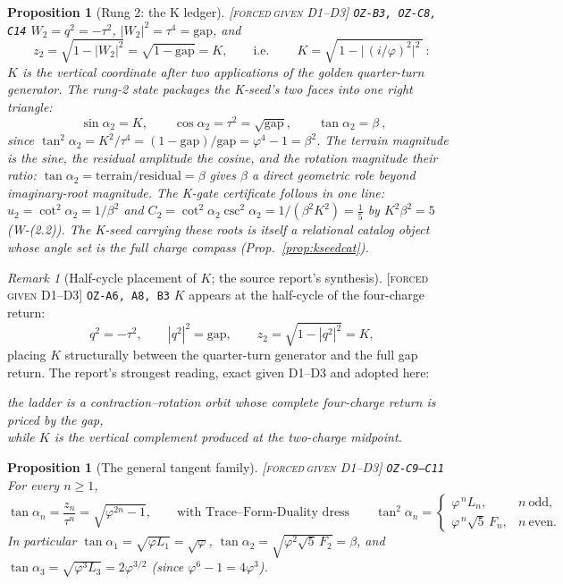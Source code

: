 \documentclass[11pt]{article}
\newcommand{\tagFD}{\textcolor{cF}{\textsc{[forced}}\,\textcolor{cD}{\textsc{given D1--D3]}}}
\newcommand{\hx}[1]{\textcolor{cC}{\footnotesize\texttt{#1}}}
\newcommand{\gp}{\varphi}
\newcommand{\gapc}{\mathrm{gap}}
\theoremstyle{plain}
\newtheorem{proposition}[theorem]{Proposition}
\theoremstyle{definition}
\theoremstyle{remark}
\newtheorem{remark}[theorem]{Remark}
\begin{document}
\begin{proposition}[Rung 2: the K ledger]\label{prop:rung2}\tagFD{} \hx{OZ-B3, OZ-C8, C14}
$W_2=q^2=-\tau^2$, $|W_2|^2=\tau^4=\gapc$, and
\[
z_2=\sqrt{1-|W_2|^2}=\sqrt{1-\gapc}=K,
\qquad\text{i.e.}\qquad
\boxed{\ K=\sqrt{\,1-\bigl|\,(i/\gp)^2\bigr|^2\,}\ }:
\]
$K$ is the vertical coordinate after two applications of the golden quarter-turn
generator. The rung-2 state packages the K-seed's two faces into one right
triangle:
\[
\boxed{\ \sin\alpha_2=K,\qquad \cos\alpha_2=\tau^2=\sqrt{\gapc},\qquad
\tan\alpha_2=\beta\ },
\]
since $\tan^2\alpha_2=K^2/\tau^4=(1-\gapc)/\gapc=\gp^4-1=\beta^2$. The terrain
magnitude is the sine, the residual amplitude the cosine, and the rotation
magnitude their ratio: $\tan\alpha_2=\text{terrain}/\text{residual}=\beta$ gives
$\beta$ a direct geometric role beyond imaginary-root magnitude. The K-gate
certificate follows in one line:
$u_2=\cot^2\alpha_2=1/\beta^2$ and
$C_2=\cot^2\alpha_2\csc^2\alpha_2=1/(\beta^2K^2)=\tfrac15$ by $K^2\beta^2=5$
(W-(2.2)). The K-seed carrying these roots is itself a relational catalog
object whose angle set is the full charge compass
(Prop.~\ref{prop:kseedcat}).
\end{proposition}

\begin{remark}[Half-cycle placement of $K$; the source report's synthesis]\label{rem:halfcycle}\tagFD{} \hx{OZ-A6, A8, B3}
$K$ appears at the half-cycle of the four-charge return:
\[
q^2=-\tau^2,\qquad |q^2|^2=\gapc,\qquad z_2=\sqrt{1-|q^2|^2}=K ,
\]
placing $K$ structurally between the quarter-turn generator and the full gap
return. The report's strongest reading, exact given D1--D3 and adopted here:
\begin{center}
\emph{the ladder is a contraction--rotation orbit whose complete four-charge
return is priced by the gap,\\ while $K$ is the vertical complement produced
at the two-charge midpoint.}
\end{center}
\end{remark}

\begin{proposition}[The general tangent family]\label{prop:tangents}\tagFD{} \hx{OZ-C9--C11}
For every $n\ge1$,
\[
\tan\alpha_n=\frac{z_n}{\tau^n}=\sqrt{\gp^{2n}-1},
\qquad\text{with Trace--Form-Duality dress}\qquad
\tan^2\alpha_n=\begin{cases}\gp^{\,n}L_n,& n\ \text{odd},\\[2pt]
\gp^{\,n}\sqrt5\,F_n,& n\ \text{even}.\end{cases}
\]
In particular $\tan\alpha_1=\sqrt{\gp L_1}=\sqrt\gp$,
$\tan\alpha_2=\sqrt{\gp^2\sqrt5\,F_2}=\beta$, and
$\tan\alpha_3=\sqrt{\gp^3L_3}=2\gp^{3/2}$ (since $\gp^6-1=4\gp^3$).
\end{proposition}
\end{document}
